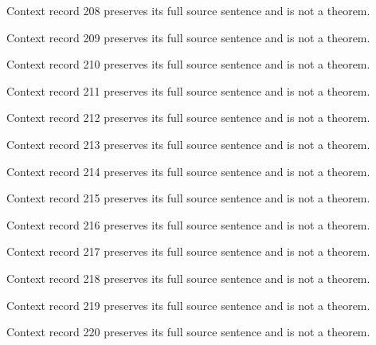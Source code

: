 \documentclass{article}
\begin{document}
\begin{remark}\label{train:context:208}Context record 208 preserves its full source sentence and is not a theorem.\end{remark}
\begin{remark}\label{train:context:209}Context record 209 preserves its full source sentence and is not a theorem.\end{remark}
\begin{remark}\label{train:context:210}Context record 210 preserves its full source sentence and is not a theorem.\end{remark}
\begin{remark}\label{train:context:211}Context record 211 preserves its full source sentence and is not a theorem.\end{remark}
\begin{remark}\label{train:context:212}Context record 212 preserves its full source sentence and is not a theorem.\end{remark}
\begin{remark}\label{train:context:213}Context record 213 preserves its full source sentence and is not a theorem.\end{remark}
\begin{remark}\label{train:context:214}Context record 214 preserves its full source sentence and is not a theorem.\end{remark}
\begin{remark}\label{train:context:215}Context record 215 preserves its full source sentence and is not a theorem.\end{remark}
\begin{remark}\label{train:context:216}Context record 216 preserves its full source sentence and is not a theorem.\end{remark}
\begin{remark}\label{train:context:217}Context record 217 preserves its full source sentence and is not a theorem.\end{remark}
\begin{remark}\label{train:context:218}Context record 218 preserves its full source sentence and is not a theorem.\end{remark}
\begin{remark}\label{train:context:219}Context record 219 preserves its full source sentence and is not a theorem.\end{remark}
\begin{remark}\label{train:context:220}Context record 220 preserves its full source sentence and is not a theorem.\end{remark}
\end{document}
